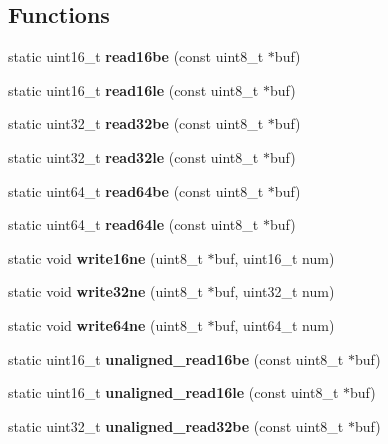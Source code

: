 \subsection*{Functions}
\begin{DoxyCompactItemize}
\item 
\mbox{\label{tuklib__integer_8h_ade5dfb160423314015a92f9d3b41364e}} 
static uint16\+\_\+t {\bfseries read16be} (const uint8\+\_\+t $\ast$buf)
\item 
\mbox{\label{tuklib__integer_8h_aabdb9935979bb9e6d6b9c43b4ea09219}} 
static uint16\+\_\+t {\bfseries read16le} (const uint8\+\_\+t $\ast$buf)
\item 
\mbox{\label{tuklib__integer_8h_ad61e457beb44cca201afa4e22a991f7c}} 
static uint32\+\_\+t {\bfseries read32be} (const uint8\+\_\+t $\ast$buf)
\item 
\mbox{\label{tuklib__integer_8h_a0c1af647880b49c2783a1b8fb5ceb8b3}} 
static uint32\+\_\+t {\bfseries read32le} (const uint8\+\_\+t $\ast$buf)
\item 
\mbox{\label{tuklib__integer_8h_a6ef94494f1932d82ccd8eec33c84f2ba}} 
static uint64\+\_\+t {\bfseries read64be} (const uint8\+\_\+t $\ast$buf)
\item 
\mbox{\label{tuklib__integer_8h_a188612f1b09af87b03a4b5f97c236771}} 
static uint64\+\_\+t {\bfseries read64le} (const uint8\+\_\+t $\ast$buf)
\item 
\mbox{\label{tuklib__integer_8h_a87d1e8e3c3158b34f10644ba14bb4bce}} 
static void {\bfseries write16ne} (uint8\+\_\+t $\ast$buf, uint16\+\_\+t num)
\item 
\mbox{\label{tuklib__integer_8h_ae1bb649e12f5096e4e17a67027dda451}} 
static void {\bfseries write32ne} (uint8\+\_\+t $\ast$buf, uint32\+\_\+t num)
\item 
\mbox{\label{tuklib__integer_8h_a018f795a238067705b3ed704625ae816}} 
static void {\bfseries write64ne} (uint8\+\_\+t $\ast$buf, uint64\+\_\+t num)
\item 
\mbox{\label{tuklib__integer_8h_a61a37dadae8ea79c9728758acab6f375}} 
static uint16\+\_\+t {\bfseries unaligned\+\_\+read16be} (const uint8\+\_\+t $\ast$buf)
\item 
\mbox{\label{tuklib__integer_8h_a03f4001c17c5907e160653277953066a}} 
static uint16\+\_\+t {\bfseries unaligned\+\_\+read16le} (const uint8\+\_\+t $\ast$buf)
\item 
\mbox{\label{tuklib__integer_8h_a32dbc938f43376657e411cb6a6285fb5}} 
static uint32\+\_\+t {\bfseries unaligned\+\_\+read32be} (const uint8\+\_\+t $\ast$buf)
\item 

\end{DoxyCompactItemize}
